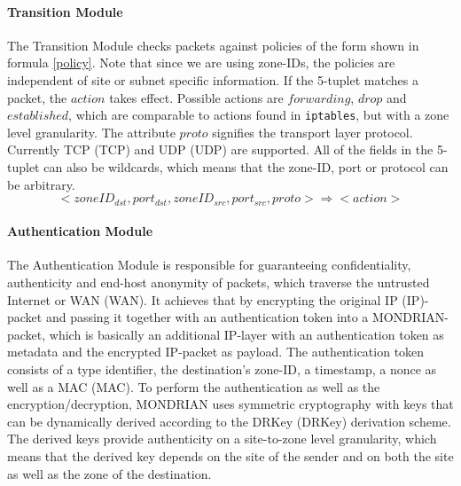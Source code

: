 \paragraph{Transition Module}
The Transition Module checks packets against policies of the form shown in formula \ref{policy}. Note that since we are using zone-IDs, the policies are independent of site or subnet specific information. If the 5-tuplet matches a packet, the $action$ takes effect. Possible actions are $forwarding$, $drop$ and $established$, which are comparable to actions found in \texttt{iptables}, but with a zone level granularity. The attribute $proto$ signifies the transport layer protocol. Currently \acs{TCP} (\acl{TCP}) and \acs{UDP} (\acl{UDP}) are supported. All of the fields in the 5-tuplet can also be wildcards, which means that the zone-ID, port or protocol can be arbitrary. 
\begin{equation}\label{policy}
    <zoneID_{dst}, port_{dst}, zoneID_{src}, port_{src}, proto>\Rightarrow <action>
\end{equation}

\paragraph{Authentication Module}
The Authentication Module is responsible for guaranteeing confidentiality, authenticity and end-host anonymity of packets, which traverse the untrusted Internet or \acs{WAN} (\acl{WAN}). It achieves that by encrypting the original \acs{IP} (\acl{IP})-packet and passing it together with an authentication token into a MONDRIAN-packet, which is basically an additional \acs{IP}-layer with an authentication token as metadata and the encrypted \acs{IP}-packet as payload. The authentication token consists of a type identifier, the destination's zone-ID, a timestamp, a nonce as well as a \acs{MAC} (\acl{MAC}). To perform the authentication as well as the encryption/decryption, MONDRIAN uses symmetric cryptography with keys that can be dynamically derived according to the \acs{DRKey} (\acl{DRKey}) \cite{perrig2017opt} derivation scheme. The derived keys provide authenticity on a site-to-zone level granularity, which means that the derived key depends on the site of the sender and on both the site as well as the zone of the destination.


